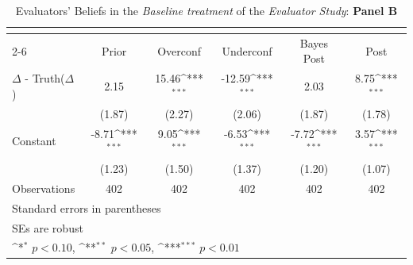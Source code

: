 \begin{table}[htbp]\centering
\def\sym#1{\ifmmode^{#1}\else\(^{#1}\)\fi}
\caption{Evaluators' Beliefs in the \textit{Baseline treatment} of the \textit{Evaluator Study}: \textbf{Panel B}}
\begin{tabular}{l*{5}{c}}
\hline\hline
                &\multicolumn{5}{c}{}                                                                          \\\cmidrule(lr){2-6}
                &\multicolumn{1}{c}{Prior}&\multicolumn{1}{c}{Overconf}&\multicolumn{1}{c}{Underconf}&\multicolumn{1}{c}{Bayes Post}&\multicolumn{1}{c}{Post}\\
\hline
$\Delta$ - Truth($\Delta$)&     2.15         &    15.46\sym{***}&   -12.59\sym{***}&     2.03         &     8.75\sym{***}\\
                &   (1.87)         &   (2.27)         &   (2.06)         &   (1.87)         &   (1.78)         \\
Constant        &    -8.71\sym{***}&     9.05\sym{***}&    -6.53\sym{***}&    -7.72\sym{***}&     3.57\sym{***}\\
                &   (1.23)         &   (1.50)         &   (1.37)         &   (1.20)         &   (1.07)         \\
\hline
Observations    &      402         &      402         &      402         &      402         &      402         \\
\hline\hline
\multicolumn{6}{l}{\footnotesize Standard errors in parentheses}\\
\multicolumn{6}{l}{\footnotesize SEs are robust}\\
\multicolumn{6}{l}{\footnotesize \sym{*} \(p<0.10\), \sym{**} \(p<0.05\), \sym{***} \(p<0.01\)}\\
\end{tabular}
\end{table}
